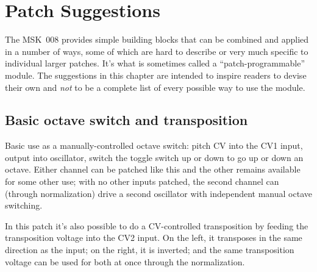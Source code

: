 
%
%
%
%
%
%

\chapter{Patch Suggestions}

The MSK~008 provides simple building blocks that can be combined and applied
in a number of ways, some of which are hard to describe or very much
specific to individual larger patches.  It's what is sometimes called a
``patch-programmable'' module.  The suggestions in this chapter are
intended to inspire readers to devise their own and \emph{not} to be a
complete list of every possible way to use the module.

\section{Basic octave switch and transposition}

Basic use as a manually-controlled octave switch:  pitch CV into the CV1
input, output into oscillator, switch the toggle switch up or down to go up
or down an octave.  Either channel can be patched like this and the other
remains available for some other use; with no other inputs patched, the
second channel can (through normalization) drive a second oscillator with
independent manual octave switching.

In this patch it's also possible to do a CV-controlled transposition by
feeding the transposition voltage into the CV2 input.  On the left, it
transposes in the same direction as the input; on the right, it is inverted;
and the same transposition voltage can be used for both at once through the
normalization.

